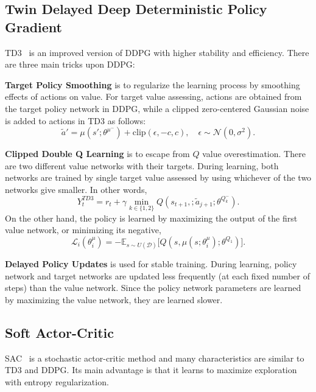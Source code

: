 \documentclass[a4paper, 12pt]{article} %
\begin{document}
\subsection{Twin Delayed Deep Deterministic Policy Gradient}
TD3~\cite{fujimoto_addressing_2018} is an improved version of DDPG with higher stability and efficiency. 
There are three main tricks upon DDPG: 

\textbf{Target Policy Smoothing} is to regularize the learning process by smoothing effects of actions on value. For target value assessing, actions are obtained from the target policy network in DDPG, while a clipped zero-centered Gaussian noise is added to actions in TD3 as follows: 
\begin{equation}
\label{eqn:td3_target_action}
\widetilde{a}' = \mu(s';\theta^{\mu^-}) + \text{clip}(\epsilon, -c, c), \quad \epsilon \sim \mathcal{N}(0, \sigma^2).
\end{equation}

\textbf{Clipped Double Q Learning} is to escape from $Q$ value overestimation. 
There are two different value networks with their targets. 
During learning, both networks are trained by single target value assessed by using whichever of the two networks give smaller. 
In other words, 
\begin{equation}
\label{eqn:td3_target}
Y_t^{TD3} = r_t + \gamma \min_{k\in\{1,2\}} Q(s_{t+1}, ;\widetilde{a}_{j+1};\theta^{Q_k^-}).
\end{equation}
On the other hand, the policy is learned by maximizing the output of the first value network, or minimizing its negative,
\begin{equation}
\label{eqn:td3_policy_loss}
\mathcal{L}_i(\theta^\mu_i) = -\mathbb{E}_{s \sim U(\mathcal{D})} \Big[ Q(s, \mu(s;\theta^\mu_i);\theta^{Q_1}) \Big].
\end{equation} 

\textbf{Delayed Policy Updates} is used for stable training. 
During learning, policy network and target networks are updated less frequently (at each fixed number of steps) than the value network. 
Since the policy network parameters are learned by maximizing the value network, they are learned slower.  

\subsection{Soft Actor-Critic}
SAC~\cite{haarnoja_soft_2018} is a stochastic actor-critic method and many characteristics are similar to TD3 and DDPG. Its main advantage is that it learns to maximize exploration with entropy regularization. 
\end{document}

